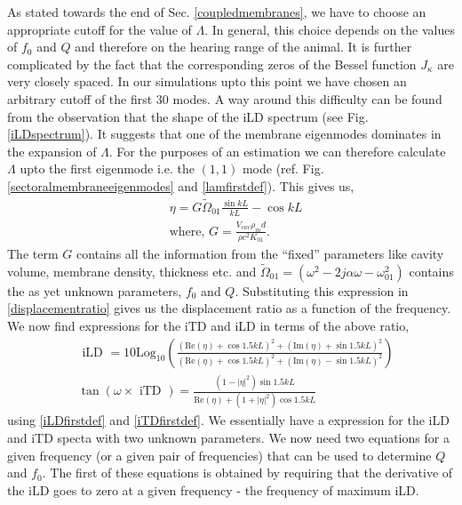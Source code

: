 As stated towards the end
of Sec. \ref{coupledmembranes}, we have to choose an appropriate cutoff for the value of $\Lambda$. In general, this choice
depends on the values of $f_0$ and $Q$ and therefore on the hearing range of the animal. It is further complicated by
the fact that the corresponding zeros of the Bessel function $J_\kappa$ are very closely spaced. In our simulations upto this point
we have chosen an arbitrary cutoff of the first $30$ modes. A way around this difficulty can be found from the observation that the shape
of the iLD spectrum (see Fig. \ref{iLDspectrum}). It suggests that one of the membrane eigenmodes dominates in the expansion of $\Lambda$. 
For the purposes of an estimation 
we can therefore calculate $\Lambda$ upto the first eigenmode i.e. the $(1,1)$ mode (ref. Fig. \ref{sectoralmembraneeigenmodes} and \eqref{lamfirstdef}).
This gives us,
\begin{align}
 &\eta=G\widetilde{\Omega}_{01}\frac{\sin kL}{kL}-\cos kL\\
 &\mbox{where, }G=\frac{V_{cav}\rho_md}{\rho c^2 K_{01}}\nonumber.
\end{align}
The term $G$ contains all the information from the ``fixed'' parameters like cavity volume, membrane density, thickness etc. and
$\widetilde{\Omega}_{01}=(\omega^2-2j\alpha\omega-\omega^2_{01})$ contains the as yet unknown parameters, $f_0$ and $Q$. Substituting
this expression in \eqref{displacementratio} gives us the displacement ratio as a function of the frequency. 
We now find expressions for the iTD and iLD in terms of the above ratio,
\begin{align}
 &\mbox{ iLD }= 10\mbox{Log}_{10}\left(\frac{(\mbox{Re}(\eta)+\cos 1.5kL)^2+(\mbox{Im}(\eta)+\sin 1.5kL)^2}{(\mbox{Re}(\eta)+\cos 1.5kL)^2+(\mbox{Im}(\eta)-\sin 1.5kL)^2}\right)\label{iLDnewdef}\\
 &\tan\left(\omega\times\mbox{ iTD }\right)= \frac{(1-|\eta|^2)\sin 1.5kL}{\mbox{Re}(\eta)+(1+|\eta|^2)\cos 1.5kL}\label{iTDnewdef}
\end{align}
using \eqref{iLDfirstdef} and \eqref{iTDfirstdef}. We essentially have 
a expression for the iLD and iTD specta with two unknown parameters. We now need two equations for a given frequency (or a given
pair of frequencies) that can be used to determine $Q$ and $f_0$. The first of these equations is obtained by requiring that
the derivative of the iLD goes to zero at a given frequency - the frequency of maximum iLD.


